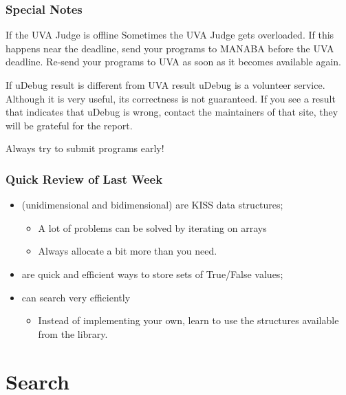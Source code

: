 \documentclass{beamer}
\begin{document}
\begin{frame}
  \frametitle{Special Notes}
  \begin{block}{If the UVA Judge is offline}
    Sometimes the UVA Judge gets overloaded. If this happens near the
    deadline, send your programs to MANABA before the UVA
    deadline. Re-send your programs to UVA as soon as it becomes
    available again.
  \end{block}
  \begin{block}{If uDebug result is different from UVA result}
    uDebug is a volunteer service. Although it is very useful, its
    correctness is not guaranteed. If you see a result that indicates
    that uDebug is wrong, contact the maintainers of that site, they
    will be grateful for the report.
  \end{block}

  Always try to submit programs early!
\end{frame}

\begin{frame}
  \frametitle{Quick Review of Last Week}
  \begin{itemize}
  \item {} (unidimensional and bidimensional) are 
    KISS data structures;
    \begin{itemize}
    \item A lot of problems can be solved by iterating on arrays
    \item Always allocate a bit more than you need.
    \end{itemize}

    \medskip

  \item {} are quick and efficient ways to store sets of
    True/False values;

    \medskip
    
  \item {} can search very efficiently
    \begin{itemize}
    \item Instead of implementing your own, learn to use the
      structures available from the library.
    \end{itemize}
  \end{itemize}
\end{frame}

\section{Search}
\end{document}
